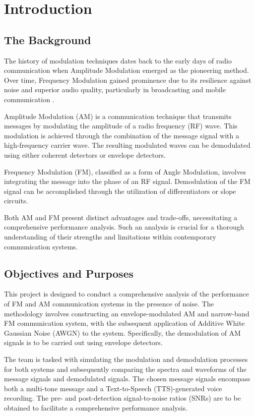 \documentclass[../ECE459FinalProjectReport.tex]{subfiles}
\begin{document}
\chapter{Introduction}
\section{The Background}
The history of modulation techniques dates back to the early days of radio communication when Amplitude Modulation emerged as the pioneering method. Over time, Frequency Modulation gained prominence due to its resilience against noise and superior audio quality, particularly in broadcasting and mobile communication \cite[p. 152]{haykinIntroductionAnalogDigital2007}. 

Amplitude Modulation (AM) is a communication technique that transmits messages by modulating the amplitude of a radio frequency (RF) wave. This modulation is achieved through the combination of the message signal with a high-frequency carrier wave. The resulting modulated waves can be demodulated using either coherent detectors or envelope detectors.

Frequency Modulation (FM), classified as a form of Angle Modulation, involves integrating the message into the phase of an RF signal. Demodulation of the FM signal can be accomplished through the utilization of differentiators or slope circuits.

Both AM and FM present distinct advantages and trade-offs, necessitating a comprehensive performance analysis. Such an analysis is crucial for a thorough understanding of their strengths and limitations within contemporary communication systems.



\section{Objectives and Purposes}

This project is designed to conduct a comprehensive analysis of the performance of FM and AM communication systems in the presence of noise. The methodology involves constructing an envelope-modulated AM and narrow-band FM communication system, with the subsequent application of Additive White Gaussian Noise (AWGN) to the system. Specifically, the demodulation of AM signals is to be carried out using envelope detectors.

The team is tasked with simulating the modulation and demodulation processes for both systems and subsequently comparing the spectra and waveforms of the message signals and demodulated signals. The chosen message signals encompass both a multi-tone message and a Text-to-Speech (TTS)-generated voice recording. The pre- and post-detection signal-to-noise ratios (SNRs) are to be obtained to facilitate a comprehensive performance analysis.
\end{document}
